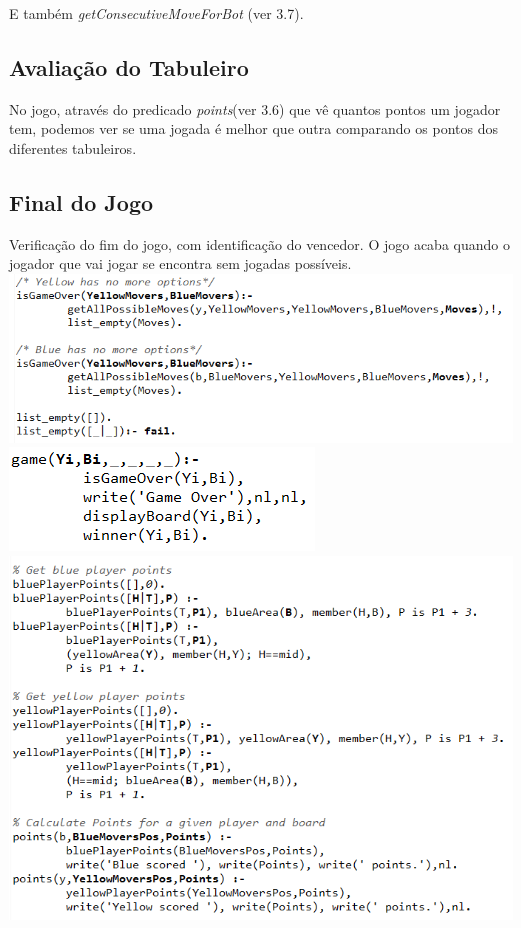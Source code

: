 \documentclass[a4paper]{article}
\begin{document}
E também \textit{getConsecutiveMoveForBot} (ver 3.7).

\subsection{Avaliação do Tabuleiro} No jogo, através do predicado \textit{points}(ver 3.6) que vê quantos pontos um jogador tem, podemos ver se uma jogada é melhor que outra comparando os pontos dos diferentes tabuleiros.

\subsection{Final do Jogo} Verificação do fim do jogo, com identificação do vencedor.
O jogo acaba quando o jogador que vai jogar se encontra sem jogadas possíveis.
\linebreak
\includegraphics[scale=0.8]{isGameOver1.png}\linebreak\linebreak
\includegraphics[scale=0.8]{isGameOver2.png}\linebreak\linebreak
\includegraphics[scale=0.8]{isGameOver3.png}\linebreak\linebreak
\end{document}
